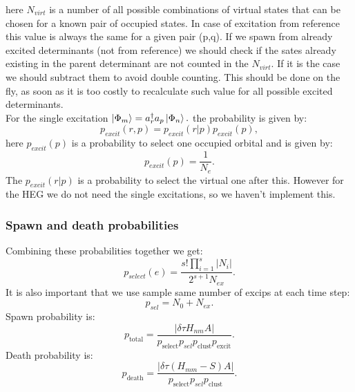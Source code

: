 \documentclass[twoside,english]{uiofysmaster}
\theoremstyle{definition}
\begin{document}
here $N_{virt}$ is a number of all possible combinations of virtual states that can be chosen for a known pair of occupied states. In case of excitation from reference this value is always the same for a given pair (p,q). If we spawn from already excited determinants (not from reference) we should check if the sates already existing in the parent determinant are not counted in the  $N_{virt}$. If it is the case we should subtract them to avoid double counting. This should be done on the fly, as soon as it is too costly to recalculate such value for all possible excited determinants.\\
For the single excitation $ \ket{\Phi_{m}}=a^\dagger_r a_p \ket{\Phi_n}.$  the probability is given by:
\begin{equation}
p_{excit}(r,p) = p_{excit}(r|p)p_{excit}(p),
\end{equation}
here $p_{excit}(p)$ is a probability to select one occupied orbital and is given by:
\begin{equation}
p_{excit}(p)=\frac{1}{N_e}.
\end{equation}
The $ p_{excit}(r|p)$ is a probability to select the virtual one after this. 
However for the HEG we do not need the single excitations, so we haven't implement this.

\subsubsection{Spawn and death probabilities}
Combining these probabilities together we get:
\begin{equation}
p_{select}(e)= \frac{s!\prod_{i=1}^{s} |N_i|}{2^{s+1}N_{ex}}.
\end{equation}
It is also important that we use sample same number of excips at each time step:
\begin{equation}
p_{sel}= N_0+N_{ex}.
\end{equation}
Spawn probability is:
\begin{equation}
p_{\text{total}} = \frac{|\delta \tau H_{nm}A|}{p_{\text{select}}p_{sel}p_{\text{clust}}p_{\text{excit}}}. 
\end{equation} 
Death probability is: 
\begin{equation}
p_{\text{death}} = \frac{|\delta \tau (H_{mm} - S)A|}{p_{\text{select}}p_{sel}p_{\text{clust}}}.
\end{equation}
\end{document}
